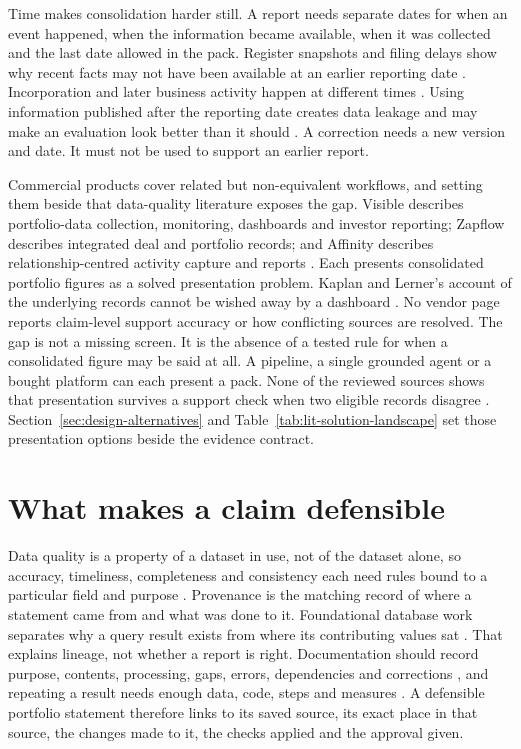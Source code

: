 Time makes consolidation harder still. A report needs separate dates for when an event happened,
when the information became available, when it was collected and the last date allowed in the
pack. Register snapshots and filing delays show why recent facts may not have been available at
an earlier reporting date \citep{hardman2023small}. Incorporation and later business activity
happen at different times \citep{galanakis2026chrt}. Using information published after the
reporting date creates data leakage and may make an evaluation look better than it should
\citep{kapoor2023leakage}. A correction needs a new version and date. It must not be used to
support an earlier report.

Commercial products cover related but non-equivalent workflows, and setting them beside that
data-quality literature exposes the gap. Visible describes portfolio-data collection, monitoring,
dashboards and investor reporting; Zapflow describes integrated deal and portfolio records; and
Affinity describes relationship-centred activity capture and reports
\citep{visible2026investors,zapflow2026portfolio,affinity2026portfolio}. Each presents
consolidated portfolio figures as a solved presentation problem. Kaplan and Lerner's account of
the underlying records cannot be wished away by a dashboard \citep{kaplan2016vcdata}. No vendor
page reports claim-level support accuracy or how conflicting sources are resolved.
The gap is not a missing screen. It is the absence of a tested rule for when a consolidated
figure may be said at all. A pipeline, a single grounded agent or a bought platform can each
present a pack. None of the reviewed sources shows that presentation survives a support check
when two eligible records disagree
\citep{buneman2001provenance,gao2023ragsurvey,guo2024multiagent}.
Section~\ref{sec:design-alternatives} and Table~\ref{tab:lit-solution-landscape} set those
presentation options beside the evidence contract.

\section{What makes a claim defensible}

Data quality is a property of a dataset in use, not of the dataset alone, so accuracy,
timeliness, completeness and consistency each need rules bound to a particular field and purpose
\citep{nikiforova2020quality,krasikov2020ready}. Provenance is the matching record of where a
statement came from and what was done to it. Foundational database work separates why a query
result exists from where its contributing values sat \citep{buneman2001provenance}. That explains
lineage, not whether a report is right. Documentation should record purpose, contents,
processing, gaps, errors, dependencies and corrections \citep{gebru2021datasheets}, and repeating
a result needs enough data, code, steps and measures \citep{pineau2021reproducibility}. A
defensible portfolio statement therefore links to its saved source, its exact place in that
source, the changes made to it, the checks applied and the approval given.


